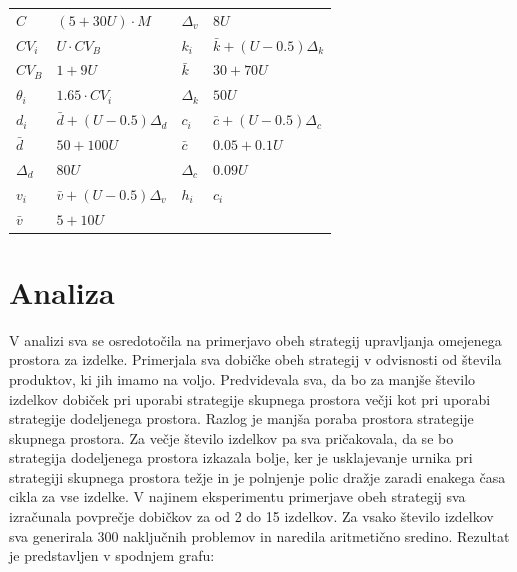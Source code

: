 \documentclass[a4paper]{article}
\begin{document}
 \vspace*{3 mm}

\begin{tabular}{ l l | l l }
	\hline
  $C$ & $(5 + 30 U) \cdot M$ & $ \Delta_v $ & $8 U$\\
  $CV_i$ & $U \cdot CV_B$ & $k_i$ & $\bar{k} + (U - 0.5) \Delta_k$\\
  $CV_B$ & $1 + 9 U$ & $ \bar{k}$ & $30 + 70 U$\\
  $\theta_i$ & $ 1.65 \cdot CV_i$ & $ \Delta_k$ & $50 U$\\
  $d_i$ & $\bar{d} + (U - 0.5) \Delta_d$ & $ c_i$ & $\bar{c} + (U - 0.5) \Delta_c$\\
  $\bar{d}$ & $50 + 100 U$ & $\bar{c}$ & $ 0.05 + 0.1 U$\\
  $\Delta_d$ & $80 U$ & $\Delta_c$ & $0.09 U$\\
  $ v_i$ & $\bar{v} + (U - 0.5) \Delta_v$ & $h_i$ & $ c_i$\\
  $ \bar{v}$ & $ 5 + 10 U$ & &\\
	\hline
\end{tabular}

\pagebreak

\section{Analiza}

V analizi sva se osredotočila na primerjavo obeh strategij upravljanja omejenega prostora za izdelke. Primerjala sva dobičke obeh strategij v odvisnosti od števila produktov, ki jih imamo na voljo. Predvidevala sva, da bo za manjše število izdelkov dobiček pri uporabi strategije skupnega prostora večji kot pri uporabi strategije dodeljenega prostora. Razlog je manjša poraba prostora strategije skupnega prostora. Za večje število izdelkov pa sva pričakovala, da se bo strategija dodeljenega prostora izkazala bolje, ker je usklajevanje urnika pri strategiji skupnega prostora težje in je polnjenje polic dražje zaradi enakega časa cikla za vse izdelke. V najinem eksperimentu primerjave obeh strategij sva izračunala povprečje dobičkov za od 2 do 15 izdelkov. Za vsako število izdelkov sva generirala 300 naključnih problemov in naredila aritmetično sredino. Rezultat je predstavljen v spodnjem grafu:
\end{document}
